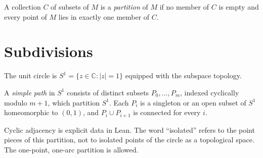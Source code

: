     \begin{definition}[Partition]\label{def:partition}

      \mathlibok
      A collection $C$ of subsets of $M$ is a \emph{partition} of $M$ if no
      member of $C$ is empty and every point of $M$ lies in exactly one member
      of $C$.
    \end{definition}

  \section{Subdivisions}

    \begin{definition}\label{def:unit-circle}
      \leanok
      The unit circle is $S^1 = \{ z \in \mathbb{C} : | z | = 1 \}$ equipped
      with the subspace topology.
    \end{definition}

    \begin{definition}\label{def:simple-path}
      \leanok
      A \emph{simple path} in $S^1$ consists of distinct subsets
      $P_0,\ldots,P_m$, indexed cyclically modulo $m+1$, which partition $S^1$.
      Each $P_i$ is a singleton or an open subset of $S^1$ homeomorphic to
      $(0,1)$, and $P_i\cup P_{i+1}$ is connected for every $i$.
    \end{definition}

    Cyclic adjacency is explicit data in Lean. The word ``isolated'' refers
    to the point pieces of this partition, not to isolated points of the
    circle as a topological space. The one-point, one-arc partition is allowed.

